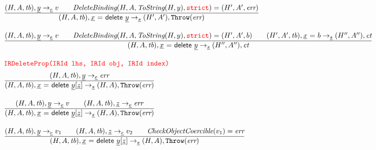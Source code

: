 \[\begin{array}{l@{~~}l@{~~}ll}
\frac{\begin{matrix}
\evale, \ir{y} \rightarrow_{\ir\expr} v
\rulesep
\hf{DeleteBinding}(H,A,\hf{ToString}(H,y),\strict) = (H', A', \err)
\end{matrix}}{\begin{matrix}
\state, \irdel \rightarrow_{\ir\stmt} \resp, \error
\end{matrix}}
\\[2em]

\frac{\begin{matrix}
\evale, \ir{y} \rightarrow_{\ir\expr} v
\rulesep
\hf{DeleteBinding}(H,A,\hf{ToString}(H,y),\strict) = (H', A', b)
\rulesep
(H',A',\tb), \irid \ {\tt =} \ b \rightarrow_{\ir\stmt} \respp, \ct
\end{matrix}}{\begin{matrix}
\state, \irdel \rightarrow_{\ir\stmt} \respp, \ct
\end{matrix}}
\\[2em]


\mtt{\normalsize\inred IRDeleteProp(IRId lhs, IRId obj, IRId index)}\\[.5em]
\frac{\begin{matrix}
\evale, \ir{y} \rightarrow_{\ir\expr} \err
\end{matrix}}{\begin{matrix}
\state, \irdelprop \rightarrow_{\ir\stmt} \res, \error
\end{matrix}}
\\[2em]

\frac{\begin{matrix}
\evale, \ir{y} \rightarrow_{\ir\expr} v
\rulesep
\evale, \ir{z} \rightarrow_{\ir\expr} \err
\end{matrix}}{\begin{matrix}
\state, \irdelprop \rightarrow_{\ir\stmt} \res, \error
\end{matrix}}
\\[2em]

\frac{\begin{matrix}
\evale, \ir{y} \rightarrow_{\ir\expr} v_1
\rulesep
\evale, \ir{z} \rightarrow_{\ir\expr} v_2
\rulesep
\hf{CheckObjectCoercible}(v_1) = \err
\end{matrix}}{\begin{matrix}
\state, \irdelprop \rightarrow_{\ir\stmt} \res, \error
\end{matrix}}
\\[2em]


\end{array}\]
